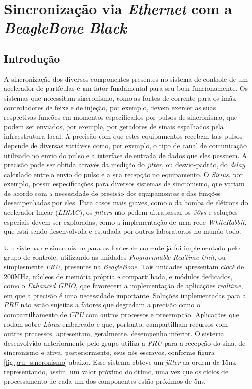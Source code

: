 \section {Sincronização via \textit{Ethernet} com a \textit{BeagleBone Black}}

\subsection {Introdução}

A sincronização dos diversos componentes presentes no sistema de controle de um
acelerador de partículas é um fator fundamental para seu bom funcionamento. Os
sistemas que necessitam sincronismo, como as fontes de corrente para os imãs,
controladores de feixe e de injeção, por exemplo, devem exercer as suas
respectivas funções em momentos especificados por pulsos de sincronismo, que
podem ser enviados, por exemplo, por geradores de sinais espalhados pela
infraestrutura local. A precisão com que estes equipamentos recebem tais pulsos
depende de diversas variáveis como, por exemplo, o tipo de canal de comunicação
utilizado no envio do pulso e a interface de entrada de dados que eles possuem.
A precisão pode ser obtida através da medição do \textit{jitter}, ou
desvio-padrão, do \textit{delay} calculado entre o envio do pulso e a sua
recepção no equipamento.
O \textit{Sirius}, por exemplo, possui especificações para diversos sistemas de
sincronismo, que variam de acordo com a necessidade de precisão dos equipamentos
e das funções desempenhadas por eles. Para casos mais graves, como o da bomba de
elétrons do acelerador linear (\textit{LINAC}), os \textit{jitters} não podem
ultrapassar os \textit{50ps} e soluções especiais devem ser exploradas, como a
implementação de uma rede \textit{WhiteRabbit}, que está sendo
desenvolvida e estudada por outros laboratórios no mundo todo.

\vspace{12pt}

Um sistema de sincronismo para as fontes de corrente já
foi implementado pelo grupo de controle, utilizando as unidades
\textit{Programmable Realtime Unit}, ou simplesmente \textit{PRU}, presentes na
\textit{BeagleBone}. Tais unidades apresentam \textit{clock} de 200MHz,
núcleos de memória própria e compartilhada, e módulos dedicados, como o
\textit{Enhanced GPIO}, que favorecem a implementação de aplicações
\textit{realtime}, em que a precisão é uma necessidade importante. Soluções
implementadas para a \textit{PRU} não estão sujeitas a fatores que degradam a
precisão como o compartilhamento de \textit{CPU} com outros
processos e preeempção. Aplicações que rodam sobre \textit{Linux} embarcado e
que, portanto, compartilham recursos com outros processos, apresentam,
geralmente, desempenho inferior. O sistema desenvolvido anteriormente pelo grupo
utiliza a \textit{PRU} para a recepção do sinal de sincronismo e ativa, posteriormente, seus nós
escravos, conforme figura \ref{fig:pru_sincronismo} abaixo. Esse sistema obteve
um \textit{jitter} da ordem de 15ns, representando, assim, um valor próximo do
ótimo, uma vez que os ciclos de processamento de cada um dos componentes estão
próximos de 5ns.


